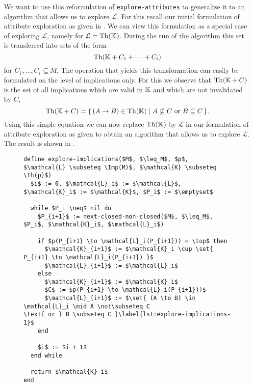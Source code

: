 We want to use this reformulation of \lstinline{explore-attributes} to generalize it to an
algorithm that allows us to explore $\mathcal{L}$.  For this recall our initial
formulation of attribute exploration as given in .  We can view
this formulation as a special case of exploring $\mathcal{L}$, namely for $\mathcal{L} =
\operatorname{Th}({\mathbb{K}})$.  During the run of the algorithm this set is transferred into sets of the
form
\begin{equation*}
  \operatorname{Th}({\mathbb{K}} + C_1 + \dots + C_i)
\end{equation*}
for $C_1, \dots, C_i \subseteq M$.  The operation that yields this transformation can
easily be formulated on the level of implications only.  For this we observe that
$\operatorname{Th}({\mathbb{K}} + C)$ is the set of all implications which are valid in ${\mathbb{K}}$ and which are
not invalidated by $C$, \ie
\begin{equation}
  \label{eq:35}
  \operatorname{Th}({\mathbb{K}} + C) = {\{\, (A \to B) \in \operatorname{Th}({\mathbb{K}}) \mid A \not\subseteq C \text{ or } B
    \subseteq C \,\}}.
\end{equation}
Using this simple equation we can now replace $\operatorname{Th}({\mathbb{K}})$ by $\mathcal{L}$ in our
formulation of attribute exploration as given
 to obtain an algorithm that
allows us to explore $\mathcal{L}$.  The result is shown in
.

\begin{figure}[tp]
  \centering
  \begin{Algorithm}
    \label{alg:explore-implications}
    \hspace*{0cm}
\begin{lstlisting}
define explore-implications($M$, $\leq_M$, $p$, $\mathcal{L} \subseteq \Imp(M)$, $\mathcal{K} \subseteq \Th(p)$)
  $i$ := 0, $\mathcal{L}_i$ := $\mathcal{L}$, $\mathcal{K}_i$ := $\mathcal{K}$, $P_i$ := $\emptyset$

  while $P_i \neq$ nil do
    $P_{i+1}$ := next-closed-non-closed($M$, $\leq_M$, $P_i$, $\mathcal{K}_i$, $\mathcal{L}_i$)

    if $p(P_{i+1} \to \mathcal{L}_i(P_{i+1})) = \top$ then
      $\mathcal{K}_{i+1}$ := $\mathcal{K}_i \cup \set{ P_{i+1} \to \mathcal{L}_i(P_{i+1}) }$
      $\mathcal{L}_{i+1}$ := $\mathcal{L}_i$
    else
      $\mathcal{K}_{i+1}$ := $\mathcal{K}_i$
      $C$ := $p(P_{i+1} \to \mathcal{L}_i(P_{i+1}))$
      $\mathcal{L}_{i+1}$ := $\set{ (A \to B) \in \mathcal{L}_i \mid A \not\subseteq C
\text{ or } B \subseteq C }\label{lst:explore-implications-1}$
    end

    $i$ := $i + 1$
  end while

  return $\mathcal{K}_i$  
end
\end{lstlisting}
  \end{Algorithm}
\end{figure}

